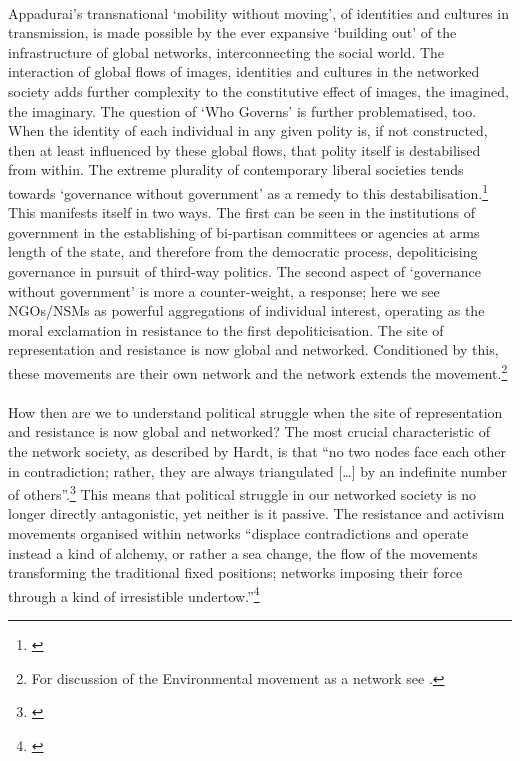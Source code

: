 \paragraph{}Appadurai's transnational `mobility without moving', of identities and cultures in transmission, is made possible by the ever expansive `building out' of the infrastructure of global networks, interconnecting the social world. The interaction of global flows of images, identities and cultures in the networked society adds further complexity to the constitutive effect of images, the imagined, the imaginary. The question of `Who Governs' is further problematised, too. When the identity of each individual in any given polity is, if not constructed, then at least influenced by these global flows, that polity itself is destabilised from within. The extreme plurality of contemporary liberal societies tends towards `governance without government' as a remedy to this destabilisation.\footnote{\cite[pp. 13-14]{Hardt:2001jl}} This manifests itself in two ways. The first can be seen in the institutions of government in the establishing of bi-partisan committees or agencies at arms length of the state, and therefore from the democratic process, depoliticising governance in pursuit of third-way politics. The second aspect of `governance without government' is more a counter-weight, a response; here we see NGOs/NSMs as powerful aggregations of individual interest, operating as the moral exclamation in resistance to the first depoliticisation. The site of representation and resistance is now global and networked. Conditioned by this, these movements are their own network and the network extends the movement.\footnote{For discussion of the Environmental movement as a network see \cite{rosenblatt:2004mn}.}

\paragraph{}How then are we to understand political struggle when the site of representation and resistance is now global and networked? The most crucial characteristic of the network society, as described by Hardt, is that ``no two nodes face each other in contradiction; rather, they are always triangulated [\ldots] by an indefinite number of others''.\footnote{\cite[p. 117]{Hardt:2002}} This means that political struggle in our networked society is no longer directly antagonistic, yet neither is it passive. The resistance and activism movements organised within networks ``displace contradictions and operate instead a kind of alchemy, or rather a sea change, the flow of the movements transforming the traditional fixed positions; networks imposing their force through a kind of irresistible undertow.''\footnote{\cite[p. 117]{Hardt:2002}}

